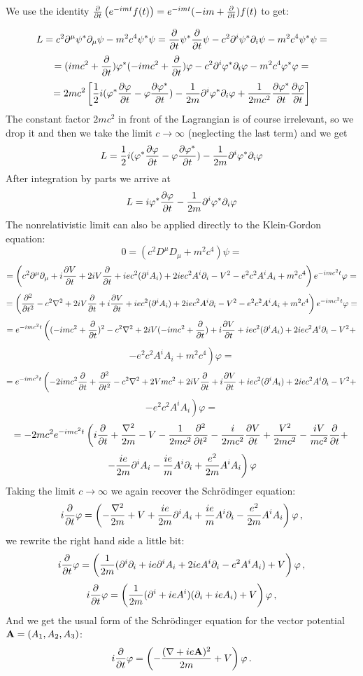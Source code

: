 We use the identity
${\partial\over\partial t}\left(e^{-imt}f(t)\right)=
e^{-imt}(-im+{\partial\over\partial t})f(t)$ to get:

$$L=c^2\partial^\mu\psi^*\partial_\mu\psi-m^2c^4\psi^*\psi=
{\partial\over\partial t}\psi^*{\partial\over\partial t}\psi
-c^2\partial^i\psi^*\partial_i\psi-m^2c^4\psi^*\psi=$$
$$=(imc^2+{\partial\over\partial t})\varphi^*
(-imc^2+{\partial\over\partial t})\varphi
-c^2\partial^i\varphi^*\partial_i\varphi-m^2c^4\varphi^*\varphi=$$
$$=2mc^2\left[{1\over2}i(\varphi^*{\partial\varphi\over\partial t}-
\varphi{\partial\varphi^*\over\partial t})-
{1\over2m}\partial^i\varphi^*\partial_i\varphi
+{1\over2mc^2}{\partial\varphi^*\over\partial t}
{\partial\varphi\over\partial t}\right]$$
The constant factor $2mc^2$ in front of the Lagrangian is of course irrelevant,
so we drop it and then we take the limit $c\to\infty$ (neglecting the last
term) and we get
$$L={1\over2}i(\varphi^*{\partial\varphi\over\partial t}-
\varphi{\partial\varphi^*\over\partial t})-
{1\over2m}\partial^i\varphi^*\partial_i\varphi
$$
After integration by parts we arrive at
$$L=i\varphi^*{\partial\varphi\over\partial t}
-{1\over 2m}\partial^i\varphi^*\partial_i
\varphi$$
The nonrelativistic limit can also be applied directly to the Klein-Gordon equation:
$$0=(c^2D^\mu D_\mu+m^2c^4)\psi=$$
$$=\left(
c^2\partial^\mu\partial_\mu
+i{\partial V\over\partial t}
+2iV{\partial\over\partial t}
+iec^2(\partial^i A_i)
+2iec^2A^i\partial_i
-V^2
-e^2c^2A^iA_i
+m^2c^4
\right)e^{-imc^2t}\varphi=
$$
$$=\left(
{\partial^2\over\partial t^2}
-c^2\nabla^2
+2iV{\partial\over\partial t}
+i{\partial V\over\partial t}
+iec^2(\partial^i A_i)
+2iec^2A^i\partial_i
-V^2
-e^2c^2A^iA_i
+m^2c^4
\right)e^{-imc^2t}\varphi=
$$
$$=e^{-imc^2t}\left(
(-imc^2+{\partial\over\partial t})^2
-c^2\nabla^2
+2iV(-imc^2+{\partial\over\partial t})
+i{\partial V\over\partial t}
+iec^2(\partial^i A_i)
+2iec^2A^i\partial_i
-V^2+ \right.
$$
$$\left.
-e^2c^2A^iA_i
+m^2c^4
\right)\varphi=
$$
$$=e^{-imc^2t}\left(
-2imc^2{\partial\over\partial t}+{\partial^2\over\partial t^2}
-c^2\nabla^2
+2Vmc^2
+2iV{\partial\over\partial t}
+i{\partial V\over\partial t}
+iec^2(\partial^i A_i)
+2iec^2A^i\partial_i
-V^2+ \right.
$$
$$\left.
-e^2c^2A^iA_i
\right)\varphi=
$$
$$=
-2mc^2 e^{-imc^2 t} \left(i{\partial\over\partial t}+{\nabla^2\over2m}-V
-{1\over2mc^2}{\partial^2\over\partial t^2}-{i\over2mc^2}{\partial
V\over\partial t}+{V^2\over2mc^2}-{iV\over mc^2}{\partial\over\partial
t}+\right.$$
$$\left.-{ie\over2m}\partial^i A_i-{ie\over
m}A^i\partial_i+{e^2\over2m}A^iA_i\right)\varphi
$$
Taking the limit $c\to\infty$ we again recover the Schr\"odinger equation:
$$i{\partial\over\partial t}\varphi=\left(-{\nabla^2\over2
m}+V
+{ie\over2m}\partial^i A_i
+{ie\over m}A^i\partial_i
-{e^2\over2m}A^iA_i
\right)\varphi\,,$$
we rewrite the right hand side a little bit:
$$i{\partial\over\partial t}\varphi=\left({1\over2 m}
(\partial^i\partial_i
+ie\partial^i A_i
+2ieA^i\partial_i
-e^2A^iA_i
)
+V
\right)\varphi\,,$$
$$i{\partial\over\partial t}\varphi=\left({1\over2 m}
(\partial^i+ieA^i)(\partial_i+ieA_i)
+V
\right)\varphi\,,$$
And we get the usual form of the Schr\"odinger equation for the vector
potential ${\bf A}=(A_1, A_2, A_3)$:
$$i{\partial\over\partial t}\varphi=\left(-{(\nabla+ie{\bf A})^2\over2 m}
+V \right)\varphi\,.$$
